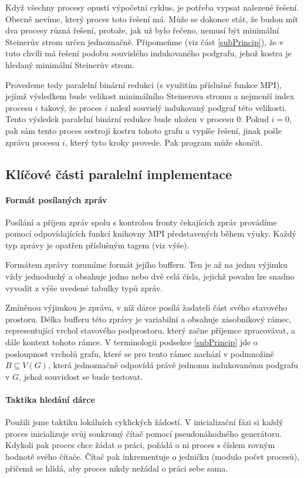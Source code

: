 \documentclass[12pt]{article}
\theoremstyle{definition}
\begin{document}
Když všechny procesy opustí výpočetní cyklus, je potřeba vypsat nalezené řešení.
Obecně nevíme, který proces toto řešení má. Může se dokonce stát, že budou mít dva procesy
různá řešení, protože, jak už bylo řečeno, nemusí být minimální Steinerův strom určen jednoznačně.
Připomeňme (viz část \ref{subPrincip}), že v tuto chvíli má řešení podobu souvislého indukovaného podgrafu, jehož kostra
je hledaný minimální Steinerův strom.

Provedeme tedy paralelní binární redukci (s využitím příslušné funkce MPI), jejímž výsledkem bude velikost
minimálního Steinerova stromu a nejmenší index procesu $i$ takový, že proces $i$ nalezl souvislý indukovaný podgraf této velikosti. Tento výsledek
paralelní binární redukce bude uložen v procesu $0$. Pokud $i=0$, pak sám tento proces sestrojí kostru tohoto grafu a vypíše řešení, jinak pošle zprávu procesu $i$,
který tyto kroky provede. Pak program může skončit.

\subsection{Klíčové části paralelní implementace}\label{subParkey}
\paragraph{Formát posílaných zpráv}
Posílání a příjem zpráv spolu s kontrolou fronty čekajících zpráv provádíme
pomocí odpovídajících funkcí knihovny MPI představených během výuky. Každý typ
zprávy je opatřen příslušným tagem (viz výše).

Formátem zprávy rozumíme formát jejího bufferu. Ten je až na jednu výjimku vždy jednoduchý
a obsahuje jedno nebo dvě celá čísla, jejichž povahu lze snadno vyvodit z výše
uvedené tabulky typů zpráv.

Zmíněnou výjimkou je zpráva, v níž dárce posílá žadateli část svého stavového prostoru.
Délka bufferu této zprávy je variabilní a obsahuje zásobníkový rámec, representující
vrchol stavového podprostoru, který začne příjemce zpracovávat, a dále kontext tohoto rámce.
V terminologii podsekce \ref{subPrincip} jde o posloupnost vrcholů grafu, které se pro tento rámec nachází
v podmnožině $B\subseteq V(G)$, která jednoznačně odpovídá právě jednomu indukovanému podgrafu v $G$,
jehož souvislost se bude testovat.

\paragraph{Taktika hledání dárce}\mbox{}\newline
Použili jsme taktiku lokálních cyklických žádostí. V inicializační fázi
si každý proces inicializuje svůj soukromý čítač pomocí pseudonáhodného
generátoru. Kdykoli pak proces chce žádat o práci, požádá o ni proces s číslem
rovným hodnotě svého čítače. Čítač pak inkrementuje o jedničku (modulo počet procesů),
přičemž se hlídá, aby proces nikdy nežádal o práci sebe sama.
\end{document}
